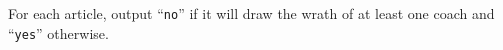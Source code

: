 
For each article, output ``\texttt{no}'' if it will draw the wrath of at least one coach and ``\texttt{yes}'' otherwise.
